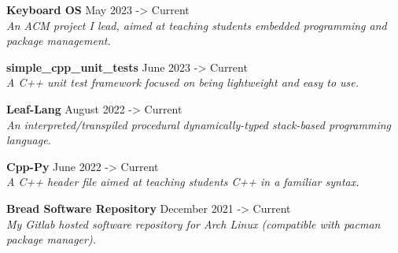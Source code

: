 \documentclass[10pt,letterpaper]{article}
\newcommand{\customtext}[2]{%
    {\fontsize{#1}{\dimexpr #1pt+2pt}\selectfont #2}%
}
\begin{document}
\begin{flushleft}
    {\customtext{12}{\textbf{Keyboard OS}} \hfill \customtext{12}{May 2023 -> Current}} \\
    \customtext{9}{\textit{An ACM project I lead, aimed at teaching students embedded programming and package management.}}
    \vspace{14pt}

    {\customtext{12}{\textbf{simple\_cpp\_unit\_tests}} \hfill \customtext{12}{June 2023 -> Current}} \\
    \customtext{9}{\textit{A C++ unit test framework focused on being lightweight and easy to use.}}
    \vspace{14pt}

    {\customtext{12}{\textbf{Leaf-Lang}} \hfill \customtext{12}{August 2022 -> Current}} \\
    \customtext{9}{\textit{An interpreted/transpiled procedural dynamically-typed stack-based programming language.}}
    \vspace{14pt}


    {\customtext{12}{\textbf{Cpp-Py}} \hfill \customtext{12}{June 2022 -> Current}} \\
    \customtext{9}{\textit{A C++ header file aimed at teaching students C++ in a familiar syntax.}}
    \vspace{14pt}


    {\customtext{12}{\textbf{Bread Software Repository}} \hfill \customtext{12}{December 2021 -> Current}} \\
    \customtext{9}{\textit{My Gitlab hosted software repository for Arch Linux (compatible with pacman package manager).}}
    \vspace{14pt}

\end{flushleft}
\end{document}
